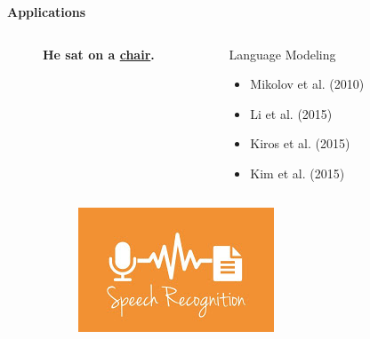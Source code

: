 \documentclass{beamer}
\begin{document}
	\begin{frame}
		\color{blue}
		\centering
		\LARGE{\textbf{Applications}}
	\end{frame}
	\begin{frame}
		\centering
		\begin{figure}
			\begin{minipage}[t][7cm][t]{\textwidth}
				
				\begin{overprint}
					\onslide<1>	
					\begin{columns}
						
						\begin{column}{0.6\textwidth}
							\hspace{1cm}\textbf{He sat on a \underline{chair}.}
						\end{column}
						\begin{column}{0.4\textwidth}
							\begin{block}{Language Modeling}
								\begin{itemize}
									\item Mikolov et al. (2010)
									\item Li et al. (2015)	
									\item Kiros et al. (2015)
									\item Kim et al. (2015)
								\end{itemize}
							\end{block}
						\end{column}
					\end{columns}
					
					\onslide<2>
					\begin{columns}
						\begin{column}{0.6\textwidth}
							\begin{figure}[ht]
								\centering
								\includegraphics[width=0.8\linewidth]{images/speechrecog}
								

\end{figure}
\end{column}
\end{columns}
\end{overprint}
\end{minipage}
\end{figure}
\end{frame}
\end{document}
